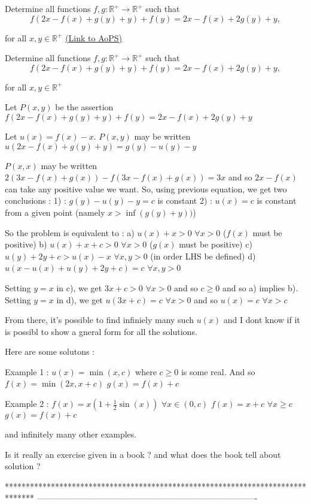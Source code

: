 \begin{problem}
	Determine all functions $f,g : \mathbb{R}^+ \to \mathbb{R}^+$ such that \[ f(2x-f(x)+g(y)+y)+f(y)=2x-f(x)+2g(y)+y ,\]
       
for all $x,y \in \mathbb{R}^+$
	\flushright \href{https://artofproblemsolving.com/community/c6h558086}{(Link to AoPS)}
\end{problem}



\begin{solution}
	\begin{tcolorbox}Determine all functions $f,g : \mathbb{R}^+ \to \mathbb{R}^+$ such that \[ f(2x-f(x)+g(y)+y)+f(y)=2x-f(x)+2g(y)+y ,\]
       
for all $x,y \in \mathbb{R}^+$\end{tcolorbox}
Let $P(x,y)$ be the assertion $f(2x-f(x)+g(y)+y)+f(y)=2x-f(x)+2g(y)+y$

Let $u(x)=f(x)-x$. $P(x,y)$ may be written $u(2x-f(x)+g(y)+y)=g(y)-u(y)-y$

$P(x,x)$ may be written $2(3x-f(x)+g(x))-f(3x-f(x)+g(x))=3x$ and so $2x-f(x)$ can take any positive value we want.
So, using previous equation, we get two conclusions :
1) : $g(y)-u(y)-y=c$ is constant
2) : $u(x)=c$ is constant from a given point (namely $x>\inf(g(y)+y))$)

So the problem is equivalent to :
a) $u(x)+x>0$ $\forall x>0$ ($f(x)$ must be positive)
b) $u(x)+x+c>0$ $\forall x>0$ ($g(x)$ must be positive)
c) $u(y)+2y+c>u(x)-x$ $\forall x,y>0$ (in order LHS be defined)
d) $u(x-u(x)+u(y)+2y+c)=c$ $\forall x,y>0$

Setting $y=x$ in c), we get $3x+c>0$ $\forall x>0$ and so $c\ge 0$ and so a) implies b).
Setting $y=x$ in d), we get $u(3x+c)=c$ $\forall x>0$ and so $u(x)=c$ $\forall x>c$

From there, it's possible to find infiniely many such $u(x)$ and I dont know if it is possibl to show a gneral form for all the solutions. 

Here are some solutons :

Example 1 : $u(x)=\min(x,c)$ where $c\ge 0$ is some real. And so 
$f(x)=\min(2x,x+c)$
$g(x)=f(x)+c$

Example 2 : 
$f(x)=x(1+\frac 12\sin(x))$ $\forall x\in(0,c)$
$f(x)=x+c$ $\forall x\ge c$
$g(x)=f(x)+c$

and infinitely many other examples.

Is it really an exercise given in a book ? and what does the book tell about solution ?
\end{solution}
*******************************************************************************
-------------------------------------------------------------------------------

